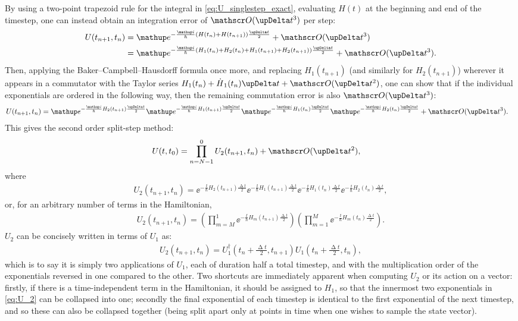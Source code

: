By using a two-point trapezoid rule for the integral in \eqref{eq:U_singlestep_exact}, evaluating $H(t)$ at the beginning and end of the timestep, one can instead obtain an integration error of $\Ord{\upDelta t^3}$ per step:
\begin{align}
U(t_{n+1}, t_n) &= \ee^{-\frac \ii \hbar \left(H(t_n) + H(t_{n+1})\right)\frac{\upDelta t} 2} + \Ord{\upDelta t^3}\\
&= \ee^{-\frac \ii \hbar \left(H_1(t_n) + H_2(t_n) + H_1(t_{n+1}) + H_2(t_{n+1})\right)\frac{\upDelta t} 2} + \Ord{\upDelta t^3}.
\end{align}
Then, applying the Baker--Campbell--Hausdorff formula once more, and replacing $H_1(t_{n+1})$ (and similarly for $H_2(t_{n+1})$) wherever it appears in a commutator with the Taylor series $H_1(t_n) + \dot H_1(t_n)\upDelta t + \Ord{\upDelta t^2}$, one can show that if the individual exponentials are ordered in the following way, then the remaining commutation error is also $\Ord{\upDelta t^3}$:
\begin{align}
U(t_{n+1}, t_n)
&= \ee^{-\frac \ii \hbar H_2(t_{n+1})\frac{\upDelta t} 2}
   \ee^{-\frac \ii \hbar H_1(t_{n+1})\frac{\upDelta t} 2}
   \ee^{-\frac \ii \hbar H_1(t_n)\frac{\upDelta t} 2}
   \ee^{-\frac \ii \hbar H_2(t_n)\frac{\upDelta t} 2} + \Ord{\upDelta t^3}.
\end{align}
This gives the second order split-step method:
\begin{align}
U(t, t_0) &= \prod_{n=N-1}^0 U_2(t_{n+1}, t_n) + \Ord{\upDelta t^2},
\end{align}
where
\begin{align}\label{eq:U_2}
U_2(t_{n+1}, t_n) =
   \ee^{-\frac \ii \hbar H_2(t_{n+1})\frac{\upDelta t} 2}
   \ee^{-\frac \ii \hbar H_1(t_{n+1})\frac{\upDelta t} 2}
   \ee^{-\frac \ii \hbar H_1(t_n)\frac{\upDelta t} 2}
   \ee^{-\frac \ii \hbar H_2(t_n)\frac{\upDelta t} 2},
\end{align}
or, for an arbitrary number of terms in the Hamiltonian,
\begin{align}\label{eq:U_2_arbitrary_terms}
U_2(t_{n+1}, t_n) =
\left(\prod_{m=M}^1 \ee^{-\frac \ii \hbar H_m(t_{n+1})\frac{\upDelta t} 2}\right)
\left(\prod_{m=1}^M \ee^{-\frac \ii \hbar H_m(t_n)\frac{\upDelta t} 2}\right).
\end{align}
$U_2$ can be concisely written in terms of $U_1$ as:
\begin{align}
U_2(t_{n+1}, t_n) =
U_1^\dagger(t_n + \tfrac {\upDelta t} 2, t_{n+1})
U_1(t_n + \tfrac {\upDelta t} 2, t_n),
\end{align}
which is to say it is simply two applications of $U_1$, each of duration half a total timestep, and with the multiplication order of the exponentials reversed in one compared to the other. Two shortcuts are immediately apparent when computing $U_2$ or its action on a vector: firstly, if there is a time-independent term in the Hamiltonian, it should be assigned to $H_1$, so that the innermost two exponentials in \eqref{eq:U_2} can be collapsed into one; secondly the final exponential of each timestep is identical to the first exponential of the next timestep, and so these can also be collapsed together (being split apart only at points in time when one wishes to sample the state vector).

